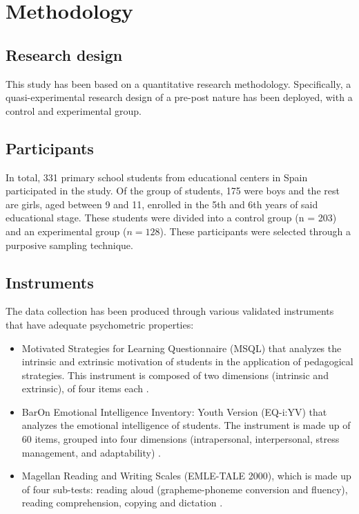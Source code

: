 \documentclass[english]{textolivre}
\begin{document}
\section{Methodology}

\subsection{Research design}

This study has been based on a quantitative research methodology. Specifically, a quasi-experimental research design of a pre-post nature has been deployed, with a control and experimental group.


\subsection{Participants}

In total, 331 primary school students from educational centers in Spain participated in the study. Of the group of students, 175 were boys and the rest are girls, aged between 9 and 11, enrolled in the 5th and 6th years of said educational stage. These students were divided into a control group (n = 203) and an experimental group ($n = 128$). These participants were selected through a purposive sampling technique.

\subsection{Instruments}

The data collection has been produced through various validated instruments that have adequate psychometric properties:
\begin{itemize}
    \item Motivated Strategies for Learning Questionnaire (MSQL) that analyzes the intrinsic and extrinsic motivation of students in the application of pedagogical strategies. This instrument is composed of two dimensions (intrinsic and extrinsic), of four items each \cite{bonanomi2020psychometric}.
    \item BarOn Emotional Intelligence Inventory: Youth Version (EQ-i:YV) that analyzes the emotional intelligence of students. The instrument is made up of 60 items, grouped into four dimensions (intrapersonal, interpersonal, stress management, and adaptability) \cite{serrano2017inteligencia}.
    \item Magellan Reading and Writing Scales (EMLE-TALE 2000), which is made up of four sub-tests: reading aloud (grapheme-phoneme conversion and fluency), reading comprehension, copying and dictation \cite{toro2000emle}.
\end{itemize}
\end{document}
